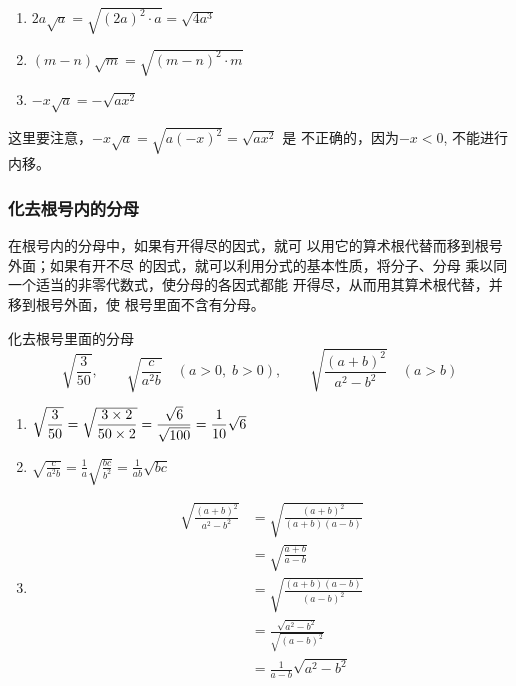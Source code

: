 \begin{solution}
\begin{enumerate}
    \item $2a\sqrt{a}=\sqrt{(2a)^2\cdot a}=\sqrt{4a^3}$
    \item $(m-n)\sqrt{m}=\sqrt{(m-n)^2\cdot m}$
    \item $-x\sqrt{a}=-\sqrt{ax^2}$
\end{enumerate}
\end{solution}

这里要注意，$-x\sqrt{a}=\sqrt{a(-x)^2}=\sqrt{ax^2}$
是
不正确的，因为$-x<0$, 不能进行内移。

\subsubsection{化去根号内的分母}
在根号内的分母中，如果有开得尽的因式，就可
以用它的算术根代替而移到根号外面；如果有开不尽
的因式，就可以利用分式的基本性质，将分子、分母
乘以同一个适当的非零代数式，使分母的各因式都能
开得尽，从而用其算术根代替，并移到根号外面，使
根号里面不含有分母。
\begin{example}
    化去根号里面的分母
\[\sqrt{\frac{3}{50}},\qquad \sqrt{\frac{c}{a^2b}}\quad (a>0,\; b>0),\qquad \sqrt{\frac{(a+b)^2}{a^2-b^2}}\quad (a>b)\]
\end{example}

\begin{solution}    
\begin{enumerate}
    \item $\sqrt{\dfrac{3}{50}}=\sqrt{\dfrac{3\times2}{50\times2}}=\dfrac{\sqrt{6}}{\sqrt{100}}=\dfrac{1}{10}\sqrt{6}$
    \item $\sqrt{\frac{c}{a^2b}}=\frac{1}{a}\sqrt{\frac{bc}{b^2}}=\frac{1}{ab}\sqrt{bc}$
    \item \[\begin{split}
        \sqrt{\frac{(a+b)^2}{a^2-b^2}} &= \sqrt{\frac{(a+b)^2}{(a+b)(a-b)}}\\
        &=\sqrt{\frac{a+b}{a-b}}\\
        &=\sqrt{\frac{(a+b)(a-b)}{(a-b)^2}}\\
        &=\frac{\sqrt{a^2-b^2}}{\sqrt{(a-b)^2}}\\
        &=\frac{1}{a-b}\sqrt{a^2-b^2}
    \end{split}\]
\end{enumerate}

\end{solution}

